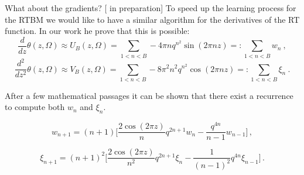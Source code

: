 \documentclass[10pt]{beamer}
\begin{document}
\begin{frame}{What about the gradients? \hfill \small [\cite{new} in preparation]}
    To speed up the learning process for the RTBM we would like to have a similar algorithm for the derivatives
    of the RT function. 
    In our work he prove that this is possible:
    \begin{equation*}
        \frac{d}{d z} \theta(z, \Omega) \approx U_B(z, \Omega) = \sum_{1 < n < B}  - 4 \pi n  q^{n^2} \sin(2 \pi n z) =:  \sum_{1 < n < B} w_n \ ,
   \end{equation*}
   \begin{equation*}
    \frac{d^2}{d z^2} \theta(z, \Omega) \approx V_B(z, \Omega) = \sum_{1 < n < B}  - 8 \pi^2 n^2 q^{n^2} \cos(2 \pi n z) =:  \sum_{1 < n < B} \xi_n \ .
   \end{equation*}

   After a few mathematical passages it can be shown that there exist a recurrence to compute both $w_n$ and $\xi_n$.


   \begin{equation*}
    w_{n+1} =  (n+1) \bigg[ \frac{2 \cos(2 \pi z)}{n} q^{2n + 1} w_n - 
    \frac{q^{4n}}{n-1} w_{n-1}\bigg]\,,
   \end{equation*}

   \begin{equation*}
        \xi_{n+1} = (n+1)^2 \bigg[ \frac{2 \cos( 2 \pi z)}{n^2} q^{2 n + 1} \xi_n 
        - \frac{1}{(n-1)^2}  q^{4n}\xi_{n-1} \bigg]\,.
   \end{equation*}

\end{frame}
\end{document}
